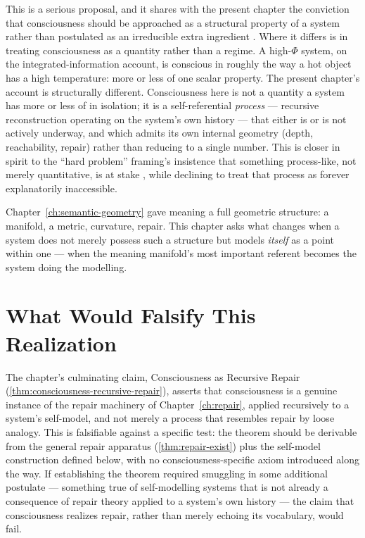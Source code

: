 \documentclass[12pt,twoside,openright]{book}
\begin{document}
This is a serious proposal, and it shares with the present
chapter the conviction that consciousness should be
approached as a structural property of a system rather than
postulated as an irreducible extra ingredient
\parencite{dennett1991}. Where it differs is in treating
consciousness as a quantity rather than a regime. A
high-$\Phi$ system, on the integrated-information account, is
conscious in roughly the way a hot object has a high
temperature: more or less of one scalar property. The present
chapter's account is structurally different. Consciousness
here is not a quantity a system has more or less of in
isolation; it is a self-referential \emph{process} ---
recursive reconstruction operating on the system's own
history --- that either is or is not actively underway, and
which admits its own internal geometry (depth, reachability,
repair) rather than reducing to a single number. This is
closer in spirit to the ``hard problem'' framing's insistence
that something process-like, not merely quantitative, is at
stake \parencite{chalmers1996}, while declining to treat that
process as forever explanatorily inaccessible.

Chapter~\ref{ch:semantic-geometry} gave meaning a full
geometric structure: a manifold, a metric, curvature, repair.
This chapter asks what changes when a system does not merely
possess such a structure but models \emph{itself} as a point
within one --- when the meaning manifold's most important
referent becomes the system doing the modelling.

\section{What Would Falsify This Realization}
\label{sec:ch21-falsifiability}

The chapter's culminating claim, Consciousness as Recursive
Repair (\cref{thm:consciousness-recursive-repair}), asserts
that consciousness is a genuine instance of the repair
machinery of Chapter~\ref{ch:repair}, applied recursively to
a system's self-model, and not merely a process that
resembles repair by loose analogy. This is falsifiable
against a specific test: the theorem should be derivable from
the general repair apparatus (\cref{thm:repair-exist}) plus
the self-model construction defined below, with no
consciousness-specific axiom introduced along the way. If
establishing the theorem required smuggling in some
additional postulate --- something true of self-modelling
systems that is not already a consequence of repair theory
applied to a system's own history --- the claim that
consciousness realizes repair, rather than merely echoing its
vocabulary, would fail.
\end{document}

